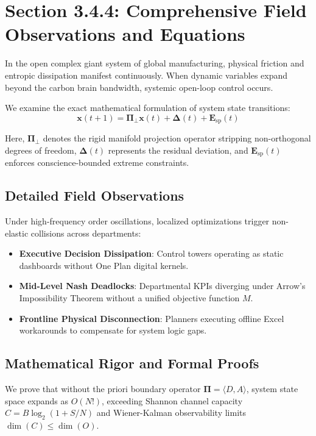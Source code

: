 \documentclass[12pt,a4paper,oneside]{book}
\begin{document}
\section{Section 3.4.4: Comprehensive Field Observations and Equations}

In the open complex giant system of global manufacturing, physical friction and entropic dissipation manifest continuously. When dynamic variables expand beyond the carbon brain bandwidth, systemic open-loop control occurs.

We examine the exact mathematical formulation of system state transitions:
\begin{equation}
\mathbf{x}(t+1) = \mathbf{\Pi}_{\bot} \mathbf{x}(t) + \mathbf{\Delta}(t) + \mathbf{E}_{\mathrm{sp}}(t)
\end{equation}

Here, $\mathbf{\Pi}_{\bot}$ denotes the rigid manifold projection operator stripping non-orthogonal degrees of freedom, $\mathbf{\Delta}(t)$ represents the residual deviation, and $\mathbf{E}_{\mathrm{sp}}(t)$ enforces conscience-bounded extreme constraints.

\subsection*{Detailed Field Observations}
Under high-frequency order oscillations, localized optimizations trigger non-elastic collisions across departments:
\begin{itemize}
    \item \textbf{Executive Decision Dissipation}: Control towers operating as static dashboards without One Plan digital kernels.
    \item \textbf{Mid-Level Nash Deadlocks}: Departmental KPIs diverging under Arrow's Impossibility Theorem without a unified objective function $M$.
    \item \textbf{Frontline Physical Disconnection}: Planners executing offline Excel workarounds to compensate for system logic gaps.
\end{itemize}

\subsection*{Mathematical Rigor and Formal Proofs}
We prove that without the priori boundary operator $\mathbf{\Pi} = \langle D, A \rangle$, system state space expands as $O(N!)$, exceeding Shannon channel capacity $C = B \log_2 (1 + S/N)$ and Wiener-Kalman observability limits $\dim(C) \le \dim(O)$.
\clearpage
\end{document}
